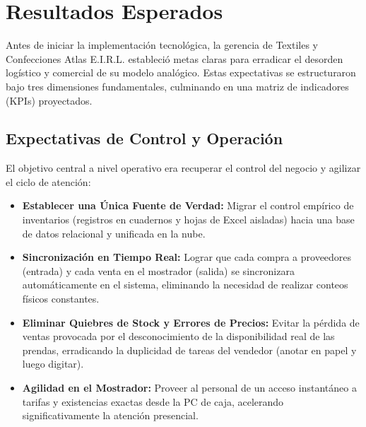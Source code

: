 \section{Resultados Esperados}

Antes de iniciar la implementación tecnológica, la gerencia de Textiles y Confecciones Atlas E.I.R.L. estableció metas claras para erradicar el desorden logístico y comercial de su modelo analógico. Estas expectativas se estructuraron bajo tres dimensiones fundamentales, culminando en una matriz de indicadores (KPIs) proyectados.

\subsection{Expectativas de Control y Operación}
El objetivo central a nivel operativo era recuperar el control del negocio y agilizar el ciclo de atención:
\begin{itemize}
    \item \textbf{Establecer una Única Fuente de Verdad:} Migrar el control empírico de inventarios (registros en cuadernos y hojas de Excel aisladas) hacia una base de datos relacional y unificada en la nube.
    \item \textbf{Sincronización en Tiempo Real:} Lograr que cada compra a proveedores (entrada) y cada venta en el mostrador (salida) se sincronizara automáticamente en el sistema, eliminando la necesidad de realizar conteos físicos constantes.
    \item \textbf{Eliminar Quiebres de Stock y Errores de Precios:} Evitar la pérdida de ventas provocada por el desconocimiento de la disponibilidad real de las prendas, erradicando la duplicidad de tareas del vendedor (anotar en papel y luego digitar).
    \item \textbf{Agilidad en el Mostrador:} Proveer al personal de un acceso instantáneo a tarifas y existencias exactas desde la PC de caja, acelerando significativamente la atención presencial.
\end{itemize}

